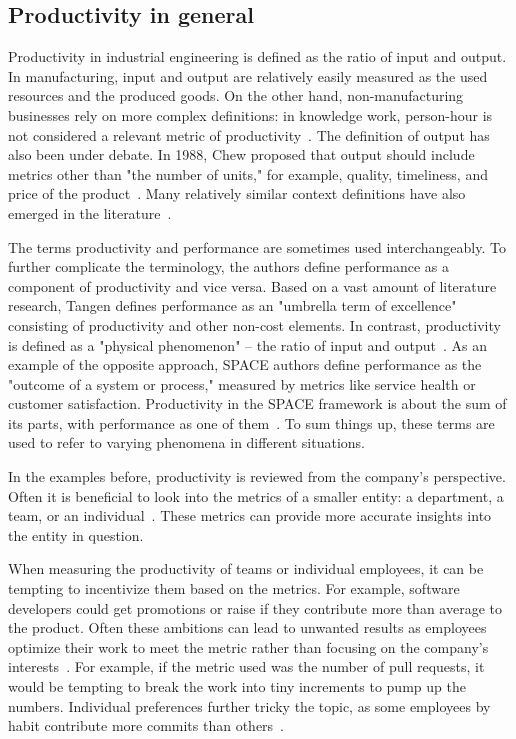 \subsection{Productivity in general}
Productivity in industrial engineering is defined as the ratio of input and output\cite{syverson_what_2011, chew_no-nonsense_1988}. In manufacturing, input and output are relatively easily measured as the used resources and the produced goods. On the other hand, non-manufacturing businesses rely on more complex definitions: in knowledge work, person-hour is not considered a relevant metric of productivity~\cite{tangen_demystifying_2005}. The definition of output has also been under debate. In 1988, Chew proposed that output should include metrics other than "the number of units," for example, quality, timeliness, and price of the product~\cite{chew_no-nonsense_1988}. Many relatively similar context definitions have also emerged in the literature~\cite{tangen_demystifying_2005}.

The terms productivity and performance are sometimes used interchangeably. To further complicate the terminology, the authors define performance as a component of productivity and vice versa. Based on a vast amount of literature research, Tangen defines performance as an "umbrella term of excellence" consisting of productivity and other non-cost elements. In contrast, productivity is defined as a "physical phenomenon" – the ratio of input and output~\cite{tangen_demystifying_2005}. As an example of the opposite approach, SPACE authors define performance as the "outcome of a system or process," measured by metrics like service health or customer satisfaction. Productivity in the SPACE framework is about the sum of its parts, with performance as one of them~\cite{forsgren_space_2021}. To sum things up, these terms are used to refer to varying phenomena in different situations.

In the examples before, productivity is reviewed from the company's perspective. Often it is beneficial to look into the metrics of a smaller entity: a department, a team, or an individual~\cite{forsgren_space_2021, tangen_demystifying_2005}. These metrics can provide more accurate insights into the entity in question.

When measuring the productivity of teams or individual employees, it can be tempting to incentivize them based on the metrics. For example, software developers could get promotions or raise if they contribute more than average to the product. Often these ambitions can lead to unwanted results as employees optimize their work to meet the metric rather than focusing on the company's interests~\cite{symons_software_2010, chew_no-nonsense_1988}. For example, if the metric used was the number of pull requests, it would be tempting to break the work into tiny increments to pump up the numbers. Individual preferences further tricky the topic, as some employees by habit contribute more commits than others~\cite{oliveira_code_2020}. 

